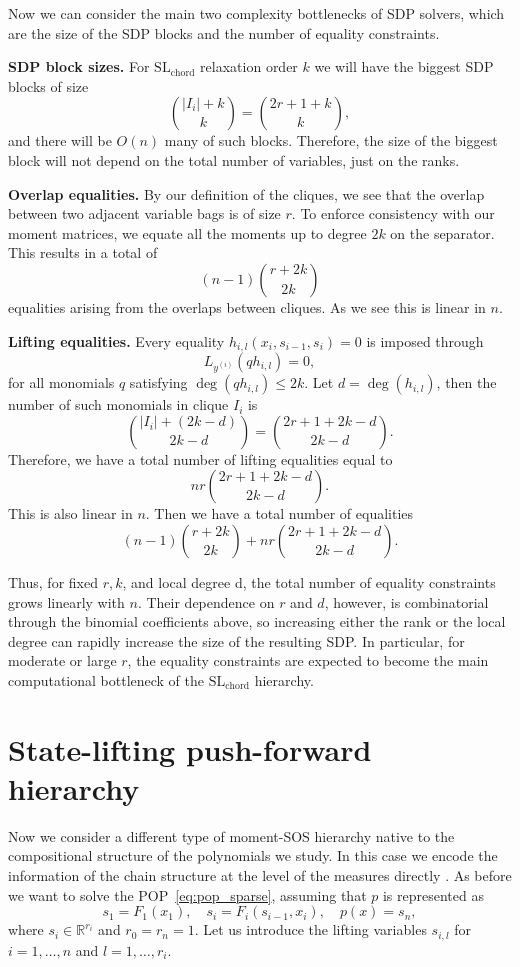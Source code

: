 \documentclass[11pt,a4paper]{article}
\newcommand{\R}{\mathbb R}
\theoremstyle{definition}
\begin{document}
Now we can consider the main two complexity bottlenecks of SDP solvers, which are the size of the SDP blocks and the number of equality constraints.

\textbf{SDP block sizes.} For $\mathrm{SL}_{\mathrm{chord}}$ relaxation order $k$ we will have the biggest SDP blocks of size
\[
\binom{|I_i|+k}{k}=\binom{2r+1+k}{k},
\]
and there will be $O(n)$ many of such blocks. Therefore, the size of the biggest block will not depend on the total number of variables, just on the ranks.

\textbf{Overlap equalities.} By our definition of the cliques, we see that the overlap between two adjacent variable bags is of size $r$. To enforce consistency with our moment matrices, we equate all the moments up to degree $2k$ on the separator. This results in a total of
\[
(n-1)\binom{r+2k}{2k}
\]
equalities arising from the overlaps between cliques. As we see this is linear in $n$.

\textbf{Lifting equalities.} Every equality $h_{i,l}(x_i,s_{i-1},s_i)=0$ is imposed through 
\[
L_{y^{(i)}}(qh_{i,l})=0,
\]
for all monomials $q$ satisfying $\deg(qh_{i,l})\leq 2k$. Let $d=\deg(h_{i,l})$, then the number of such monomials in clique $I_i$ is 
\[
\binom{|I_i|+(2k-d)}{2k-d}=\binom{2r+1+2k-d}{2k-d}.
\]
Therefore, we have a total number of lifting equalities equal to 
\[
nr\binom{2r+1+2k-d}{2k-d}.
\]
This is also linear in $n$. Then we have a total number of equalities 
\[
(n-1)\binom{r+2k}{2k}+nr\binom{2r+1+2k-d}{2k-d}.
\]

Thus, for fixed $r, k$, and local degree d, the total number of equality constraints grows linearly with $n$. Their dependence on $r$ and $d$, however, is combinatorial through the binomial coefficients above, so increasing either the rank or the local degree can rapidly increase the size of the resulting SDP. In particular, for moderate or large $r$, the equality constraints are expected to become the main computational bottleneck of the $\mathrm{SL}_{\mathrm{chord}}$ hierarchy.

\section{State-lifting push-forward hierarchy}\label{sec:push-forward}

Now we consider a different type of moment-SOS hierarchy native to the compositional structure of the polynomials we study. In this case we encode the information of the chain structure at the level of the measures directly \cite{lasserre2008nonlinear}. As before we want to solve the POP~\eqref{eq:pop_sparse}, assuming that $p$ is represented as
\[
s_1 =F_1(x_1), \quad  s_i  = F_i(s_{i-1},x_i), \quad p(x)=s_n,
\]
where $s_i\in \R^{r_i}$ and $r_0=r_n=1$. Let us introduce the lifting variables $s_{i,l}$ for $i=1,\dots,n$ and $l=1,\dots,r_i$. 
\end{document}
